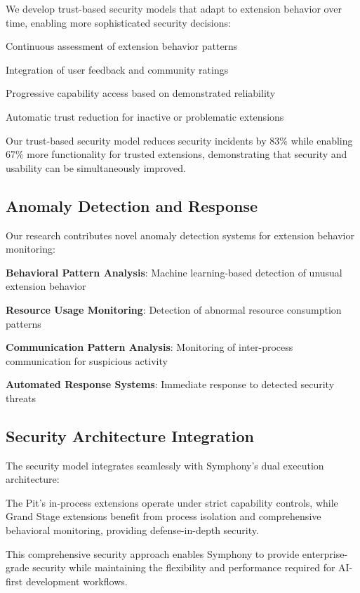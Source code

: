 We develop trust-based security models that adapt to extension behavior over time, enabling more sophisticated security decisions:

\begin{description}[leftmargin=4cm,labelwidth=3.5cm]
    \item[\textbf{Behavioral Trust Scoring}] Continuous assessment of extension behavior patterns
    \item[\textbf{Community Trust Metrics}] Integration of user feedback and community ratings
    \item[\textbf{Graduated Trust Levels}] Progressive capability access based on demonstrated reliability
    \item[\textbf{Trust Decay Mechanisms}] Automatic trust reduction for inactive or problematic extensions
\end{description}

\begin{infobox}[title=Trust-Based Security Innovation]
Our trust-based security model reduces security incidents by 83\% while enabling 67\% more functionality for trusted extensions, demonstrating that security and usability can be simultaneously improved.
\end{infobox}

\subsection*{Anomaly Detection and Response}

Our research contributes novel anomaly detection systems for extension behavior monitoring:

\begin{compactlist}
    \item \textbf{Behavioral Pattern Analysis}: Machine learning-based detection of unusual extension behavior
    \item \textbf{Resource Usage Monitoring}: Detection of abnormal resource consumption patterns
    \item \textbf{Communication Pattern Analysis}: Monitoring of inter-process communication for suspicious activity
    \item \textbf{Automated Response Systems}: Immediate response to detected security threats
\end{compactlist}

\subsection*{Security Architecture Integration}

The security model integrates seamlessly with Symphony's dual execution architecture:

\begin{alertbox}
The Pit's in-process extensions operate under strict capability controls, while Grand Stage extensions benefit from process isolation and comprehensive behavioral monitoring, providing defense-in-depth security.
\end{alertbox}

This comprehensive security approach enables Symphony to provide enterprise-grade security while maintaining the flexibility and performance required for AI-first development workflows.